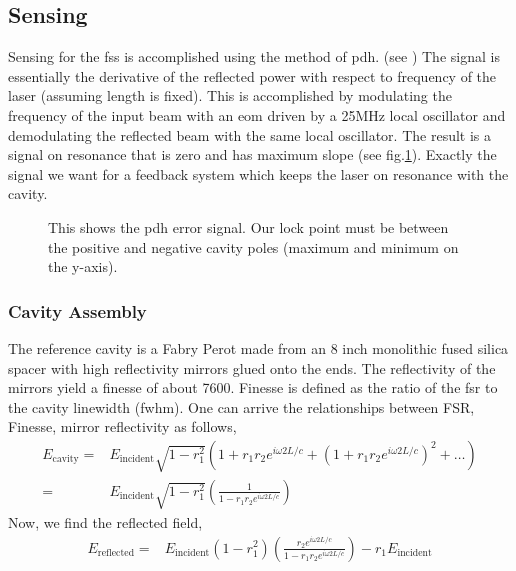 \subsection{Sensing}

Sensing for the \ac{fss} is accomplished using the method of \ac{pdh}.
(see \cite{Black:2001})
The signal is essentially the derivative of the reflected power with respect
to frequency of the laser (assuming length is fixed).
This is accomplished by modulating the frequency of the input beam with an
\ac{eom} driven by a 25MHz local oscillator and demodulating the reflected
beam with the same local oscillator.
The result is a signal on resonance that is zero and has maximum slope
(see fig.\ref{fig:pdh}).
Exactly the signal we want for a feedback system which keeps the laser on
resonance with the cavity. 

\begin{figure}
\centering
{}
\caption[PDH Error Signal]{This shows the \ac{pdh} error signal. Our lock point
  must be between the positive and negative cavity poles (maximum  and minimum on
  the y-axis).
  }
\label{fig:pdh}
\end{figure}

\subsubsection{Cavity Assembly}

The reference cavity is a Fabry Perot made from an 8 inch monolithic fused silica
spacer with high reflectivity mirrors glued onto the ends. The reflectivity
of the mirrors yield a finesse of about 7600. Finesse is defined as the ratio
of the \ac{fsr} to the cavity linewidth (\ac{fwhm}). One can arrive the
relationships between FSR, Finesse, mirror reflectivity as follows,
\begin{align}
E_{\mathrm{cavity}} =& E_{\mathrm{incident}} \sqrt{1-r_1^2} \left( 1 + r_1 r_2
    e^{i \omega 2 L /c} + \left(1+r_1 r_2 e^{i \omega 2L/c} \right)^2 + \ldots \right)
    \\
=& E_{\mathrm{incident}} \sqrt{1-r_1^2} \left( \frac{1}{1 - r_1 r_2
    e^{i \omega 2L/c}} \right)
\end{align}
Now, we find the reflected field,
\begin{align}
E_{\mathrm{reflected}} =& E_{\mathrm{incident}} \left( 1-r_1^2 \right)
    \left( \frac{r_2 e^{i \omega 2L/c}}{1 - r_1 r_2 e^{i \omega 2L/c}} \right)
    - r_1 E_{\mathrm{incident}}
\end{align}

